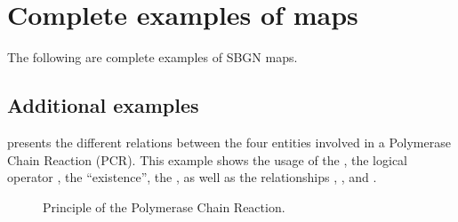 \chapter{Complete examples of \SBGNERLone maps}

The following are complete examples of SBGN \ERs maps.\\



\section{Additional examples}
 presents the different relations between the four entities involved in a Polymerase Chain Reaction (PCR). This example shows the usage of the , the logical operator , the  ``existence'', the , as well as the relationships , ,  and .

\begin{figure}[htb]
\begin{center}
\caption{Principle of the Polymerase Chain Reaction.}\label{fig:PCR}
\end{center}
\end{figure}

